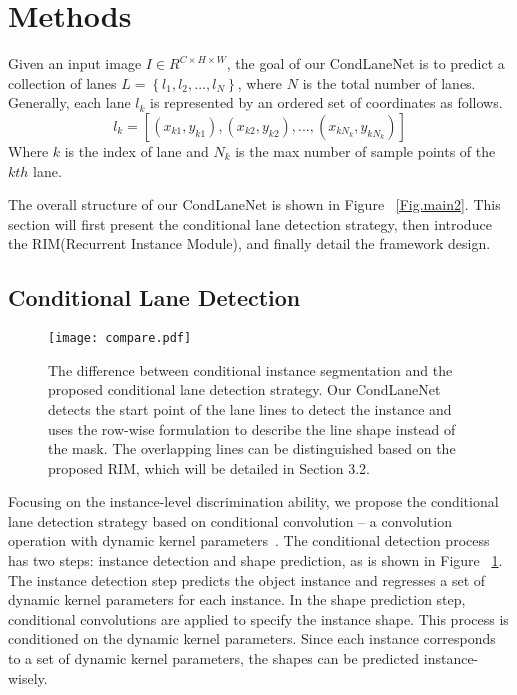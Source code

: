 \documentclass[10pt,twocolumn,letterpaper]{article}
\begin{document}
\section{Methods}

Given an input image \(I\in R^{C\times H\times W}\), the goal of our CondLaneNet is to predict a collection of lanes \(L=\left \{ l_1, l_2, ..., l_N \right \}\), where \(N\) is the total number of lanes. Generally, each lane \(l_k\) is represented by an ordered set of coordinates as follows.
\begin{equation}
    \displaystyle
    l_k=[(x_{k1}, y_{k1}), (x_{k2}, y_{k2}), ..., (x_{kN_k}, y_{kN_k})]
\end{equation}Where \(k\) is the index of lane and \(N_k\) is the max number of sample points of the \(kth\) lane. 

The overall structure of our CondLaneNet is shown in Figure ~\ref{Fig.main2}.
This section will first present the conditional lane detection strategy, then introduce the RIM(Recurrent Instance Module), and finally detail the framework design.

\subsection{Conditional Lane Detection}

\begin{figure}[ht]
\centering
\texttt{[image: compare.pdf]}
\caption{The difference between conditional instance segmentation and the proposed conditional lane detection strategy. Our CondLaneNet detects the start point of the lane lines to detect the instance and uses the row-wise formulation to describe the line shape instead of the mask. The overlapping lines can be distinguished based on the proposed RIM, which will be detailed in Section 3.2.} \label{Fig.compare} \end{figure}

Focusing on the instance-level discrimination ability, we propose the conditional lane detection strategy based on conditional convolution -- a convolution operation with dynamic kernel parameters~\cite{jia2016dynamic,yang2019condconv}. The conditional detection process~\cite{tian2020conditional, wang2020solov2} has two steps: instance detection and shape prediction, as is shown in Figure ~\ref{Fig.compare}. The instance detection step predicts the object instance and regresses a set of dynamic kernel parameters for each instance. In the shape prediction step, conditional convolutions are applied to specify the instance shape. This process is conditioned on the dynamic kernel parameters. Since each instance corresponds to a set of dynamic kernel parameters, the shapes can be predicted instance-wisely.
\end{document}
